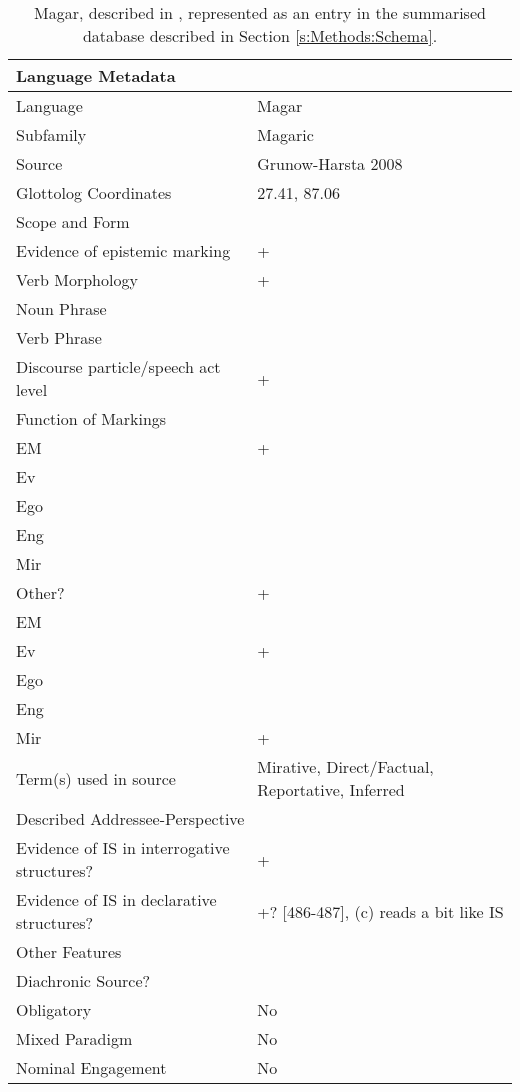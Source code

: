 \begin{table}
  \begin{tabular}{|l|l|}
  \hline\hline
  \multicolumn{2}{|l|}{Language Metadata} \\ \hline
  Language & Magar \\ \hline
  Subfamily & Magaric \\ \hline
  Source & Grunow-Harsta 2008 \\ \hline
  Glottolog Coordinates & 27.41, 87.06 \\ \hline \hline
  \multicolumn{2}{|l|}{Scope and Form} \\ \hline
  Evidence of epistemic marking & + \\ \hline
  Verb Morphology & + \\ \hline
  Noun Phrase &  \\ \hline
  Verb Phrase &  \\ \hline
  Discourse particle/speech act level & + \\ \hline \hline
  \multicolumn{2}{|l|}{Function of Markings} \\ \hline
  EM & + \\ \hline
  Ev &  \\ \hline
  Ego &  \\ \hline
  Eng &  \\ \hline
  Mir &  \\ \hline
  Other? & + \\ \hline \hline
  EM &  \\ \hline
  Ev & + \\ \hline
  Ego &  \\ \hline
  Eng &  \\ \hline
  Mir & + \\ \hline \hline
  Term(s) used in source & Mirative, Direct/Factual, Reportative, Inferred \\ \hline \hline
  \multicolumn{2}{|l|}{Described Addressee-Perspective} \\ \hline
  Evidence of IS in interrogative structures? & + \\ \hline
  Evidence of IS in declarative structures? & +? {[}486-487{]}, (c) reads a bit like IS \\ \hline \hline
  \multicolumn{2}{|l|}{Other Features} \\ \hline
  Diachronic Source? &  \\ \hline
  Obligatory & No \\ \hline 
  Mixed Paradigm & No \\ \hline
  Nominal Engagement & No \\ \hline \hline
  \end{tabular}
  \caption{Magar, described in , represented as an entry in the summarised database described in Section \ref{s:Methods:Schema}.}\label{t:Methods:SchemaExample}
  \end{table}
